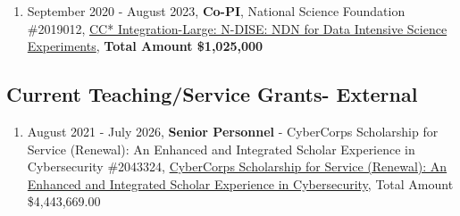 \begin{enumerate}
\item September 2020 - August 2023, \textbf{Co-PI}, National Science Foundation \#2019012,  \href{https://www.nsf.gov/awardsearch/showAward?AWD_ID=2019012}{CC* Integration-Large: N-DISE: NDN for Data Intensive Science Experiments}, \textbf{Total Amount \$1,025,000}





\end{enumerate}

\hspace{2em}


\subsection{Current Teaching/Service Grants- External}
\begin{enumerate}
\item August 2021 - July 2026, \textbf{Senior Personnel} - CyberCorps Scholarship for Service (Renewal): An Enhanced and Integrated Scholar Experience in Cybersecurity \#2043324, \href{https://www.nsf.gov/awardsearch/showAward?AWD_ID=2043324&HistoricalAwards=false}{CyberCorps Scholarship for Service (Renewal): An Enhanced and Integrated Scholar Experience in Cybersecurity}, Total Amount \$4,443,669.00
\end{enumerate}












